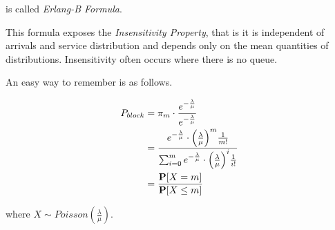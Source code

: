  is called \textit{Erlang-B Formula}.

This formula exposes the \textit{Insensitivity Property}, that is it is independent of arrivals and service distribution and depends only on the mean quantities of distributions. 
Insensitivity often occurs where there is no queue.

An easy way to remember  is as follows.

\begin{equation*}
\begin{split}
	P_{block} & = \pi_{m} \cdot \frac{e^{-\frac{\lambda}{\mu}}}{e^{-\frac{\lambda}{\mu}}} \\ 
			  & = \frac{e^{-\frac{\lambda}{\mu}} \cdot \Big(\frac{\lambda}{\mu}\Big)^{m} \frac{1}{m!}}{\sum_{i=0}^{m} e^{-\frac{\lambda}{\mu}} \cdot \Big( \frac{\lambda}{\mu} \Big)^{i} \frac{1}{i!}} \\
			  & = \frac{\mathbf{P}[X = m]}{\mathbf{P}[X \leq m]}
\end{split}
\end{equation*}

where $X \sim Poisson(\frac{\lambda}{\mu})$.